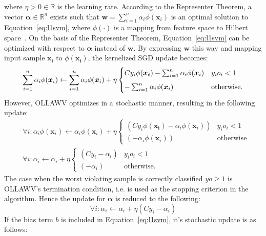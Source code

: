 \documentclass[reqno]{vcuthesis}
\newcommand{\reals}{{\mathbb{R}}}
\numberwithin{equation}{chapter}
\begin{document}
where $\eta > 0 \in \reals $ is the learning rate. According to the Representer Theorem, a vector $\bm \alpha \in \reals^n$ exists such that $\bm w = \sum_{i=1}^n \alpha_i \phi(\bm x_i)$ is an optimal solution to Equation~\ref{eq:l1svm}, where $\phi(\cdot)$ is a mapping from feature space to Hilbert space~\cite{Shalev2014}. On the basis of the Representer Theorem, Equation~\ref{eq:l1svm} can be optimized with respect to $\bm \alpha$ instead of $\bm w$. By expressing $\bm w$ this way and mapping input sample $\bm{x_i}$ to $\phi(\bm{x_i})$, the kernelized SGD update becomes:
\begin{equation*}
\centering
\sum_{i=1}^n \alpha_i \phi(\bm x_i) \leftarrow \sum_{i=1}^n \alpha_i \phi(\bm x_i) + \eta \begin{cases} 
															C y_i \phi(\bm{x_i}) - \sum_{i=1}^n \alpha_i \phi(\bm x_i) & y_i o_i < 1 \\[5pt]
															-\sum_{i=1}^n \alpha_i \phi(\bm x_i) & \text{otherwise}.
													 \end{cases}
\end{equation*}
However, OLLAWV optimizes in a stochastic manner, resulting in the following update:
\begin{align*}
&\forall i: \alpha_i \phi(\bm x_i) \leftarrow \alpha_i \phi(\bm x_i) + \eta \begin{cases} 
																													(Cy_i\phi(\bm{x_i}) - \alpha_i \phi(\bm x_i)) & y_i o_i < 1 \\
																													(- \alpha_i \phi(\bm x_i)) & \text{otherwise}
																													 \end{cases} \\							
&\forall i: \alpha_i \leftarrow \alpha_i + \eta \begin{cases} 
																(Cy_i - \alpha_i) & y_i o_i < 1 \\
																(- \alpha_i) & \text{otherwise}.
															\end{cases} 
\end{align*}
The case when the worst violating sample is correctly classified $yo \geq 1$ is OLLAWV's termination condition, i.e. is used as the stopping criterion in the algorithm. Hence the update for $\bm \alpha$ is reduced to the following:
\begin{equation}
\label{eq:alphaupdate}
\forall i: \alpha_i \leftarrow \alpha_i + \eta(Cy_i - \alpha_i)
\end{equation}
If the bias term $b$ is included in Equation~\ref{eq:l1svm}, it's stochastic update is as follows:
\end{document}

